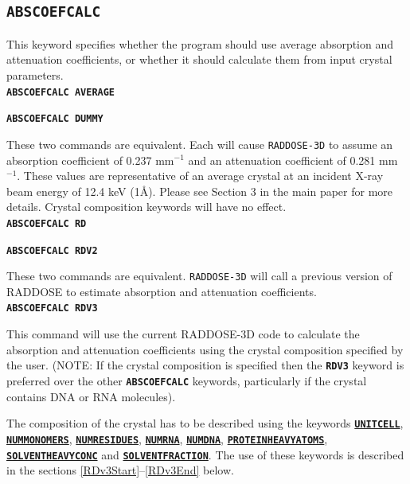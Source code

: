 \documentclass[a4paper]{article}
\newcommand{\RD}{\texttt{RADDOSE-3D}\xspace}
\newcommand{\Keyword}[1]{\texttt{\textbf{#1}}\xspace}
\newcommand{\SB}{\\[0.2em]}
\begin{document}
\subsection{\Keyword{ABSCOEFCALC}}
\label{abscoefcalc}
This keyword specifies whether the program should use average absorption and attenuation coefficients, or whether it should calculate them from input crystal parameters.\SB

\noindent \Keyword{ABSCOEFCALC AVERAGE} 

\noindent \Keyword{ABSCOEFCALC DUMMY}

These two commands are equivalent. Each will cause \RD to assume an absorption coefficient of 0.237 mm$^{-1}$ and an attenuation coefficient of 0.281 mm$^{-1}$. These values are representative of an average crystal at an incident X-ray beam energy of 12.4 keV (1\AA). Please see Section 3 in the main paper for more details. Crystal composition keywords will have no effect.\SB

\noindent \Keyword{ABSCOEFCALC RD}

\noindent \Keyword{ABSCOEFCALC RDV2}

These two commands are equivalent. \RD will call a previous version of RADDOSE to estimate absorption and attenuation coefficients.\SB

\noindent \Keyword{ABSCOEFCALC RDV3}

This command will use the current RADDOSE-3D code to calculate the absorption and attenuation coefficients using the crystal composition specified by the user. (NOTE: If the crystal composition is specified then the \Keyword{RDV3} keyword is preferred over the other \Keyword{ABSCOEFCALC} keywords, particularly if the crystal contains DNA or RNA molecules).


The composition of the crystal has to be described using the keywords
 \hyperref[unitcell]{\Keyword{UNITCELL}},
 \hyperref[nummonomers]{\Keyword{NUMMONOMERS}},
 \hyperref[numresidues]{\Keyword{NUMRESIDUES}},
 \hyperref[numrna]{\Keyword{NUMRNA}},
 \hyperref[numdna]{\Keyword{NUMDNA}},
 \hyperref[proteinheavyatoms]{\Keyword{PROTEINHEAVYATOMS}},
 \hyperref[solventheavyconc]{\Keyword{SOLVENTHEAVYCONC}} and
 \hyperref[solventfraction]{\Keyword{SOLVENTFRACTION}}.
The use of these keywords is described in the sections \ref{RDv3Start}--\ref{RDv3End} below.\SB 
\end{document}
